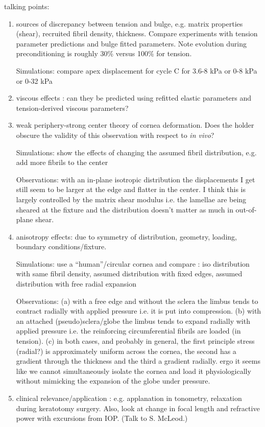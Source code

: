 \documentclass[11pt,oneside]{elsart}
\begin{document}
talking points:
\begin{enumerate}
\item sources of discrepancy between tension and bulge, 
e.g. matrix properties (shear), recruited fibril density, thickness.
Compare experiments with tension parameter predictions and bulge fitted
parameters.
Note evolution during preconditioning is roughly 30\% versus 100\% for tension.

Simulations: 
compare apex displacement for cycle C for 3.6-8 kPa or 0-8 kPa or 0-32 kPa

\item viscous effects : can they be predicted using refitted elastic parameters
and tension-derived viscous parameters?

\item weak periphery-strong center theory of cornea deformation.
Does the holder obscure the validity of this observation with respect to
{\it in vivo}?

Simulations:
show the effects of changing the assumed fibril distribution, 
e.g. add more fibrils to the center

Observations:
with an in-plane isotropic distribution the displacements I get still 
seem to be larger at the edge and flatter in the center. I think this is
largely controlled by the matrix shear modulus i.e. the lamellae are being 
sheared at the fixture and the distribution doesn't matter as much in 
out-of-plane shear.


\item anisotropy effects: due to symmetry of distribution, geometry, 
loading, boundary conditions/fixture.

Simulations:
use a ``human''/circular cornea and compare : iso distribution with same
fibril density, assumed distribution with fixed edges, assumed distribution
with free radial expansion

Observations:
(a) with a free edge and without the sclera the limbus tends to contract 
radially with applied pressure i.e. it is put into compression.
(b) with an attached (pseudo)sclera/globe the limbus tends to expand radially 
with applied pressure i.e. the reinforcing circumferential fibrils are
loaded (in tension).
(c) in both cases, and probably in general, the first principle stress (radial?)
is approximately uniform across the cornea, the second has a gradient through
the thickness and the third a gradient radially.
ergo it seems like we cannot simultaneously isolate the cornea and load
it physiologically without mimicking the expansion of the globe under pressure.

\item clinical relevance/application : e.g. applanation in tonometry,
relaxation during keratotomy surgery.
Also, look at change in focal length and refractive power with excursions 
from IOP.
(Talk to S. McLeod.)
\end{enumerate}
\end{document}
